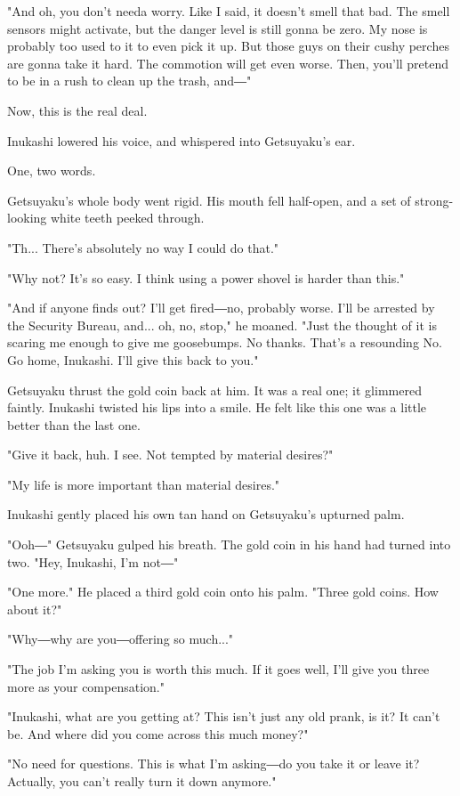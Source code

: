 "And oh, you don't needa worry. Like I said, it doesn't smell that bad.
The smell sensors might activate, but the danger level is still gonna be
zero. My nose is probably too used to it to even pick it up. But those
guys on their cushy perches are gonna take it hard. The commotion will
get even worse. Then, you'll pretend to be in a rush to clean up the
trash, and―"

Now, this is the real deal.

Inukashi lowered his voice, and whispered into Getsuyaku's ear.

One, two words.

Getsuyaku's whole body went rigid. His mouth fell half-open, and a set
of strong-looking white teeth peeked through.

"Th... There's absolutely no way I could do that."

"Why not? It's so easy. I think using a power shovel is harder than
this."

"And if anyone finds out? I'll get fired―no, probably worse. I'll be
arrested by the Security Bureau, and... oh, no, stop," he moaned. "Just
the thought of it is scaring me enough to give me goosebumps. No thanks.
That's a resounding No. Go home, Inukashi. I'll give this back to you."

Getsuyaku thrust the gold coin back at him. It was a real one; it
glimmered faintly. Inukashi twisted his lips into a smile. He felt like
this one was a little better than the last one.

"Give it back, huh. I see. Not tempted by material desires?"

"My life is more important than material desires."

Inukashi gently placed his own tan hand on Getsuyaku's upturned palm.

"Ooh―" Getsuyaku gulped his breath. The gold coin in his hand had turned
into two. "Hey, Inukashi, I'm not―"

"One more." He placed a third gold coin onto his palm. "Three gold
coins. How about it?"

"Why―why are you―offering so much..."

"The job I'm asking you is worth this much. If it goes well, I'll give
you three more as your compensation."

"Inukashi, what are you getting at? This isn't just any old prank, is
it? It can't be. And where did you come across this much money?"

"No need for questions. This is what I'm asking―do you take it or leave
it? Actually, you can't really turn it down anymore."

